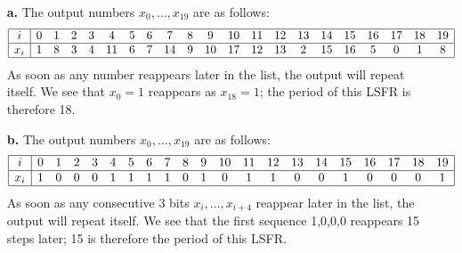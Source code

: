 \documentclass[11pt]{article}
\begin{document}
\bigskip{}
\begin{itemize}
  \item[{\bf a.}]
    The output numbers $x_0,\ldots,x_{19}$ are as follows:
    \[
      \begin{array}{|c|cccccccccccccccccccc|}\hline
          i & 0 & 1 & 2 & 3 &  4 & 5 & 6 &  7 & 8 &  9 & 10 & 11 & 12 & 13 & 14 & 15 & 16 & 17 & 18 & 19\\\hline
        x_i & 1 & 8 & 3 & 4 & 11 & 6 & 7 & 14 & 9 & 10 & 17 & 12 & 13 &  2 & 15 & 16 &  5 &  0 &  1 &  8\\\hline
      \end{array}
    \]
    As soon as any number reappears later in the list,
    the output will repeat itself.
    We see that $x_0 = 1$ reappears as $x_{18} = 1$; 
    the period of this LSFR is therefore 18.
  \item[{\bf b.}] 
    The output numbers $x_0,\ldots,x_{19}$ are as follows:
    \[
      \begin{array}{|c|cccccccccccccccccccc|}\hline
          i & 0 & 1 & 2 & 3 & 4 & 5 & 6 & 7 & 8 & 9 & 10 & 11 & 12 & 13 & 14 & 15 & 16 & 17 & 18 & 19\\\hline
        x_i & 1 & 0 & 0 & 0 & 1 & 1 & 1 & 1 & 0 & 1 &  0 &  1 &  1 &  0 &  0 &  1 &  0 &  0 &  0 &  1\\\hline
      \end{array}
    \]
    As soon as any consecutive 3 bits $x_i,\ldots,x_{i+4}$ reappear later in the list,
    the output will repeat itself.
    We see that the first sequence 1,0,0,0 reappears 15 steps later;
    15 is therefore the period of this LSFR.
\end{itemize}
\end{document}
